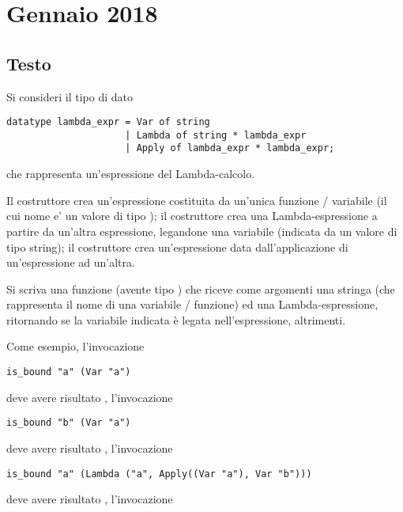 \section{Gennaio 2018}

\subsection*{Testo}

Si consideri il tipo di dato

\begin{lstlisting}[style = SML, caption = {Dichiarazione del tipo \sml{lambda\_expr}}]
datatype lambda_expr = Var of string
					 | Lambda of string * lambda_expr
					 | Apply of lambda_expr * lambda_expr;
\end{lstlisting}

che rappresenta un'espressione del Lambda-calcolo.

Il costruttore  crea un'espressione costituita da un'unica funzione / variabile (il cui nome e' un valore di tipo );
il costruttore  crea una Lambda-espressione a partire da un'altra espressione, legandone una variabile (indicata da un valore di tipo string);
il costruttore  crea un'espressione data dall'applicazione di un'espressione ad un'altra.

Si scriva una funzione  (avente tipo ) che riceve come argomenti una stringa (che rappresenta il nome di una variabile / funzione) ed una Lambda-espressione,
ritornando  se la variabile indicata è legata nell'espressione,  altrimenti.

\medskip
Come esempio, l'invocazione

\begin{lstlisting}
is_bound "a" (Var "a")
\end{lstlisting}

deve avere risultato , l'invocazione

\begin{lstlisting}
is_bound "b" (Var "a")
\end{lstlisting}

deve avere risultato , l'invocazione

\begin{lstlisting}
is_bound "a" (Lambda ("a", Apply((Var "a"), Var "b")))
\end{lstlisting}

deve avere risultato , l'invocazione

